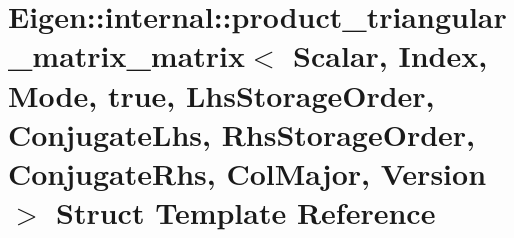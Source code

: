 \hypertarget{struct_eigen_1_1internal_1_1product__triangular__matrix__matrix_3_01_scalar_00_01_index_00_01_mocecf6b0a946de08ae1ae622ae91f7d88}{}\section{Eigen\+:\+:internal\+:\+:product\+\_\+triangular\+\_\+matrix\+\_\+matrix$<$ Scalar, Index, Mode, true, Lhs\+Storage\+Order, Conjugate\+Lhs, Rhs\+Storage\+Order, Conjugate\+Rhs, Col\+Major, Version $>$ Struct Template Reference}
\label{struct_eigen_1_1internal_1_1product__triangular__matrix__matrix_3_01_scalar_00_01_index_00_01_mocecf6b0a946de08ae1ae622ae91f7d88}
